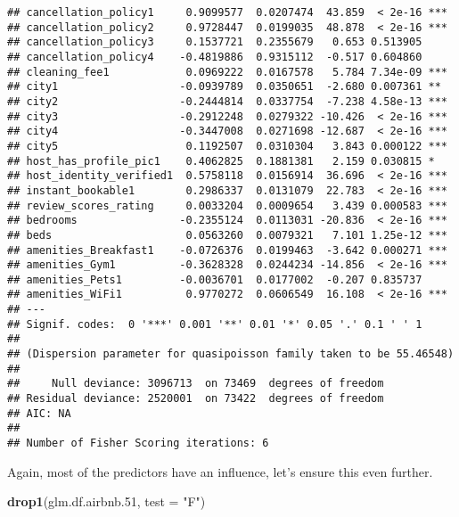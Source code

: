\documentclass[
]{article}
\newenvironment{Shaded}{\begin{snugshade}}{\end{snugshade}}
\newcommand{\DataTypeTok}[1]{\textcolor[rgb]{0.13,0.29,0.53}{#1}}
\newcommand{\FloatTok}[1]{\textcolor[rgb]{0.00,0.00,0.81}{#1}}
\newcommand{\KeywordTok}[1]{\textcolor[rgb]{0.13,0.29,0.53}{\textbf{#1}}}
\newcommand{\NormalTok}[1]{#1}
\newcommand{\StringTok}[1]{\textcolor[rgb]{0.31,0.60,0.02}{#1}}
\begin{document}
\begin{verbatim}
## cancellation_policy1     0.9099577  0.0207474  43.859  < 2e-16 ***
## cancellation_policy2     0.9728447  0.0199035  48.878  < 2e-16 ***
## cancellation_policy3     0.1537721  0.2355679   0.653 0.513905    
## cancellation_policy4    -0.4819886  0.9315112  -0.517 0.604860    
## cleaning_fee1            0.0969222  0.0167578   5.784 7.34e-09 ***
## city1                   -0.0939789  0.0350651  -2.680 0.007361 ** 
## city2                   -0.2444814  0.0337754  -7.238 4.58e-13 ***
## city3                   -0.2912248  0.0279322 -10.426  < 2e-16 ***
## city4                   -0.3447008  0.0271698 -12.687  < 2e-16 ***
## city5                    0.1192507  0.0310304   3.843 0.000122 ***
## host_has_profile_pic1    0.4062825  0.1881381   2.159 0.030815 *  
## host_identity_verified1  0.5758118  0.0156914  36.696  < 2e-16 ***
## instant_bookable1        0.2986337  0.0131079  22.783  < 2e-16 ***
## review_scores_rating     0.0033204  0.0009654   3.439 0.000583 ***
## bedrooms                -0.2355124  0.0113031 -20.836  < 2e-16 ***
## beds                     0.0563260  0.0079321   7.101 1.25e-12 ***
## amenities_Breakfast1    -0.0726376  0.0199463  -3.642 0.000271 ***
## amenities_Gym1          -0.3628328  0.0244234 -14.856  < 2e-16 ***
## amenities_Pets1         -0.0036701  0.0177002  -0.207 0.835737    
## amenities_WiFi1          0.9770272  0.0606549  16.108  < 2e-16 ***
## ---
## Signif. codes:  0 '***' 0.001 '**' 0.01 '*' 0.05 '.' 0.1 ' ' 1
## 
## (Dispersion parameter for quasipoisson family taken to be 55.46548)
## 
##     Null deviance: 3096713  on 73469  degrees of freedom
## Residual deviance: 2520001  on 73422  degrees of freedom
## AIC: NA
## 
## Number of Fisher Scoring iterations: 6
\end{verbatim}

Again, most of the predictors have an influence, let's ensure this even
further.

\begin{Shaded}
\begin{Highlighting}[]
\KeywordTok{drop1}\NormalTok{(glm.df.airbnb}\FloatTok{.51}\NormalTok{, }\DataTypeTok{test =} \StringTok{"F"}\NormalTok{)}
\end{Highlighting}
\end{Shaded}
\end{document}
